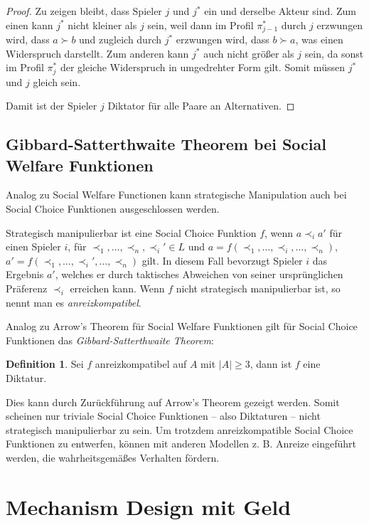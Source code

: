 \documentclass[a4paper,11pt]{article}
\theoremstyle{definition}
\newtheorem{definition}{Definition}
\theoremstyle{plain}
\theoremstyle{definition}
\begin{document}
\begin{proof}
	Zu zeigen bleibt, dass Spieler $j$ und $j^*$ ein und derselbe Akteur sind. 
	Zum einen kann $j^*$ nicht kleiner als $j$ sein, weil dann im Profil $\pi_{j-1}^*$ durch $j$ erzwungen wird, dass $a \succ b$ und zugleich durch $j^*$ erzwungen wird, dass $b \succ a$, was einen Widerspruch darstellt. 
	Zum anderen kann $j^*$ auch nicht größer als $j$ sein, da sonst im Profil $\pi_{j}^*$ der gleiche Widerspruch in umgedrehter Form gilt. Somit müssen $j^*$ und $j$ gleich sein.
	
	Damit ist der Spieler $j$ Diktator für alle Paare an Alternativen.
\end{proof}

\subsection{Gibbard-Satterthwaite Theorem bei Social Welfare Funktionen}
Analog zu Social Welfare Functionen kann strategische Manipulation auch bei Social Choice Funktionen ausgeschlossen werden.

Strategisch manipulierbar ist eine Social Choice Funktion $f$, wenn $a \prec_i a'$ 
für einen Spieler $i$, für $\prec_1, \ldots, \prec_n, \prec_i' \in L$ und 
$a = f(\prec_1, \ldots, \prec_i, \ldots, \prec_n)$, 
$a' = f(\prec_1, \ldots, \prec_i', \ldots, \prec_n)$ gilt. 
In diesem Fall bevorzugt Spieler $i$ das Ergebnis $a'$, welches er durch taktisches Abweichen von seiner ursprünglichen Präferenz $\prec_i$ erreichen kann.
Wenn $f$ nicht strategisch manipulierbar ist, so nennt man es \emph{anreizkompatibel}.

Analog zu Arrow's Theorem für Social Welfare Funktionen gilt für Social Choice Funktionen das \emph{Gibbard-Satterthwaite Theorem}:

\begin{definition}
	\label{def:GibbSatt}
	Sei $f$ anreizkompatibel auf $A$ mit $|A| \geq 3$, dann ist $f$ eine Diktatur.
\end{definition}

Dies kann durch Zurückführung auf Arrow's Theorem gezeigt werden. Somit scheinen nur triviale Social Choice Funktionen -- also Diktaturen -- nicht strategisch manipulierbar zu sein. Um trotzdem anreizkompatible Social Choice Funktionen zu entwerfen, können mit anderen Modellen {z. B.} Anreize eingeführt werden, die wahrheitsgemäßes Verhalten fördern.

\section{Mechanism Design mit Geld}
\end{document}

